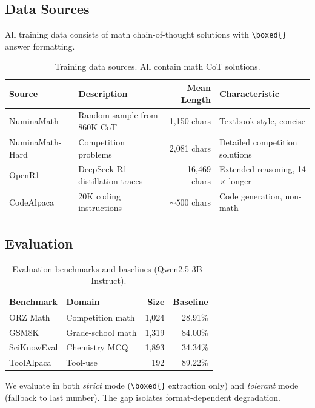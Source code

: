 \documentclass{article}
\begin{document}
\subsection{Data Sources}

All training data consists of math chain-of-thought solutions with \texttt{\textbackslash boxed\{\}} answer formatting.

\begin{table}[h]
\centering
\caption{Training data sources. All contain math CoT solutions.}
\label{tab:sources}
\small
\begin{tabular}{@{}llrl@{}}
\toprule
Source & Description & Mean Length & Characteristic \\
\midrule
NuminaMath & Random sample from 860K CoT & 1,150 chars & Textbook-style, concise \\
NuminaMath-Hard & Competition problems & 2,081 chars & Detailed competition solutions \\
OpenR1 & DeepSeek R1 distillation traces & 16,469 chars & Extended reasoning, 14$\times$ longer \\
CodeAlpaca & 20K coding instructions & ${\sim}500$ chars & Code generation, non-math \\
\bottomrule
\end{tabular}
\end{table}

\subsection{Evaluation}

\begin{table}[h]
\centering
\caption{Evaluation benchmarks and baselines (Qwen2.5-3B-Instruct).}
\label{tab:benchmarks}
\small
\begin{tabular}{@{}llrr@{}}
\toprule
Benchmark & Domain & Size & Baseline \\
\midrule
ORZ Math & Competition math & 1,024 & 28.91\% \\
GSM8K & Grade-school math & 1,319 & 84.00\% \\
SciKnowEval & Chemistry MCQ & 1,893 & 34.34\% \\
ToolAlpaca & Tool-use & 192 & 89.22\% \\
\bottomrule
\end{tabular}
\end{table}

We evaluate in both \emph{strict} mode (\texttt{\textbackslash boxed\{\}} extraction only) and \emph{tolerant} mode (fallback to last number). The gap isolates format-dependent degradation.
\end{document}
